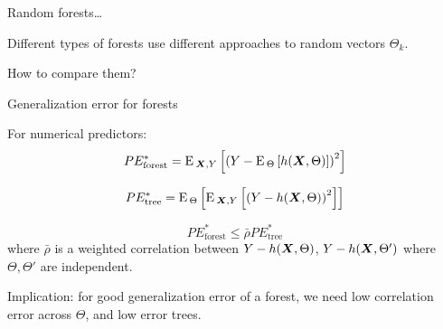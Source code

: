 \documentclass[xcolor={table}, handout]{beamer}
\begin{document}

\begin{frame}{Random forests\dots}

\begin{wideitemize}
\item Different types of forests use different approaches to random vectors $\Theta_k$. \pause
\item How to compare them?
\end{wideitemize}

\end{frame}



\begin{frame}{Generalization error for forests}

For numerical predictors:
\[
PE^{*}_{\textrm{forest}} = {\textrm E}\,_{\bm{X},Y}\left[\left(Y - {\textrm E}\,_{\Theta}\left[ h(\bm{X}, \Theta)\right]\right)^2\right]
\]\pause

\[
PE^{*}_{\textrm{tree}} = {\textrm E}\,_{\Theta}\left[ {\textrm E}\,_{\bm{X},Y}\left[\left(Y - h(\bm{X}, \Theta)\right)^2\right]\right]
\]
\pause

\[
PE^{*}_{\textrm{forest}} \le \bar \rho PE^{*}_{\textrm{tree}}
\]
where $\bar \rho$ is a weighted correlation between $Y - h(\bm{X}, \Theta)$, $Y - h(\bm{X}, \Theta')$ where $\Theta, \Theta'$ are independent. \pause


Implication: for good generalization error of a forest, we need low correlation error across $\Theta$, and low error trees. 

\end{frame}


\end{document}
